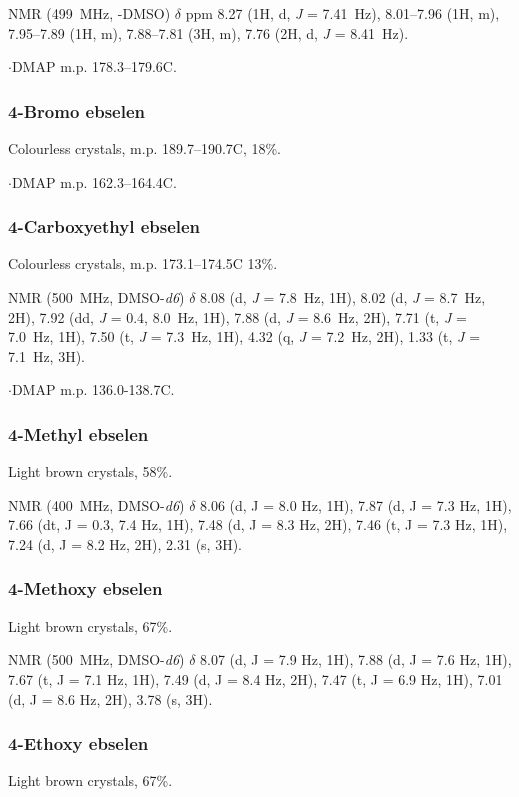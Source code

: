 \begin{refsection}
 NMR (499~MHz, -DMSO) $\delta$ ppm 8.27 (1H, d, \emph{J} = 7.41~Hz), 8.01--7.96 (1H, m), 7.95--7.89 (1H, m), 7.88--7.81 (3H, m), 7.76 (2H, d, \emph{J} = 8.41~Hz).

$\cdot$DMAP m.p. 178.3--179.6\degree C.

\subsubsection{4-Bromo ebselen }
Colourless crystals, m.p. 189.7--190.7\degree C, 18\%.

$\cdot$DMAP m.p. 162.3--164.4\degree C.

\subsubsection{4-Carboxyethyl ebselen }
Colourless crystals, m.p. 173.1--174.5\degree C 13\%.

 NMR (500~MHz, DMSO-\emph{d6}) $\delta$ 8.08 (d, \emph{J} = 7.8~Hz, 1H), 8.02 (d, \emph{J} = 8.7~Hz, 2H), 7.92 (dd, \emph{J} = 0.4, 8.0~Hz, 1H), 7.88 (d, \emph{J} = 8.6~Hz, 2H), 7.71 (t, \emph{J} = 7.0~Hz, 1H), 7.50 (t, \emph{J} = 7.3~Hz, 1H), 4.32 (q, \emph{J} = 7.2~Hz, 2H), 1.33 (t, \emph{J} = 7.1~Hz, 3H).

$\cdot$DMAP m.p. 136.0-138.7\degree C.

\subsubsection{4-Methyl ebselen }
Light brown crystals, 58\%.

 NMR (400~MHz, DMSO-\emph{d6}) $\delta$ 8.06 (d, J = 8.0 Hz, 1H), 7.87 (d, J = 7.3 Hz, 1H), 7.66 (dt, J = 0.3, 7.4 Hz, 1H), 7.48 (d, J = 8.3 Hz, 2H), 7.46 (t, J = 7.3 Hz, 1H), 7.24 (d, J = 8.2 Hz, 2H), 2.31 (s, 3H).

\subsubsection{4-Methoxy ebselen }
Light brown crystals, 67\%.

 NMR (500~MHz, DMSO-\emph{d6}) $\delta$ 8.07 (d, J = 7.9 Hz, 1H), 7.88 (d, J = 7.6 Hz, 1H), 7.67 (t, J = 7.1 Hz, 1H), 7.49 (d, J = 8.4 Hz, 2H), 7.47 (t, J = 6.9 Hz, 1H), 7.01 (d, J = 8.6 Hz, 2H), 3.78 (s, 3H).

\subsubsection{4-Ethoxy ebselen }
Light brown crystals, 67\%.


\end{refsection}
